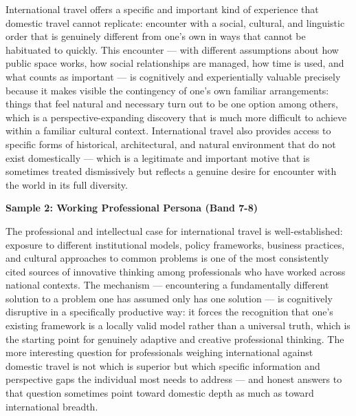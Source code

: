 International travel offers a specific and important kind of experience that domestic travel cannot replicate: encounter with a social, cultural, and linguistic order that is genuinely different from one's own in ways that cannot be habituated to quickly. This encounter — with different assumptions about how public space works, how social relationships are managed, how time is used, and what counts as important — is cognitively and experientially valuable precisely because it makes visible the contingency of one's own familiar arrangements: things that feel natural and necessary turn out to be one option among others, which is a perspective-expanding discovery that is much more difficult to achieve within a familiar cultural context. International travel also provides access to specific forms of historical, architectural, and natural environment that do not exist domestically — which is a legitimate and important motive that is sometimes treated dismissively but reflects a genuine desire for encounter with the world in its full diversity.

\textbf{Sample 2: Working Professional Persona (Band 7-8)}

The professional and intellectual case for international travel is well-established: exposure to different institutional models, policy frameworks, business practices, and cultural approaches to common problems is one of the most consistently cited sources of innovative thinking among professionals who have worked across national contexts. The mechanism — encountering a fundamentally different solution to a problem one has assumed only has one solution — is cognitively disruptive in a specifically productive way: it forces the recognition that one's existing framework is a locally valid model rather than a universal truth, which is the starting point for genuinely adaptive and creative professional thinking. The more interesting question for professionals weighing international against domestic travel is not which is superior but which specific information and perspective gaps the individual most needs to address — and honest answers to that question sometimes point toward domestic depth as much as toward international breadth.

\separator


